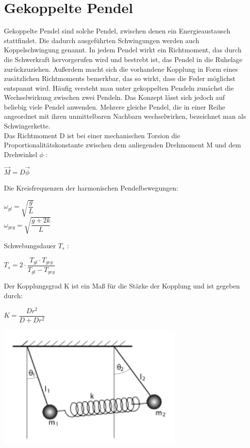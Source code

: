 \chapter{Gekoppelte Pendel}
Gekoppelte Pendel sind solche Pendel, zwischen denen ein Energieaustausch stattfindet. Die dadurch ausgeführten Schwingungen werden auch Koppelschwingung genannt. In jedem Pendel wirkt ein Richtmoment, das durch die Schwerkraft hervorgerufen wird und bestrebt ist, das Pendel in die Ruhelage zurückzuziehen. Außerdem macht sich die vorhandene Kopplung in Form eines zusätzlichen Richtmoments bemerkbar, das so wirkt, dass die Feder möglichst entspannt wird.
Häufig versteht man unter gekoppelten Pendeln zunächst die Wechselwirkung zwischen zwei Pendeln. Das Konzept lässt sich jedoch auf beliebig viele Pendel anwenden. Mehrere gleiche Pendel, die in einer Reihe angeordnet mit ihren unmittelbaren Nachbarn wechselwirken, bezeichnet man als Schwingerkette.
\\
Das Richtmoment D ist bei einer mechanischen Torsion die Proportionalitätskonstante zwischen dem anliegenden Drehmoment
M und dem Drehwinkel $\phi$ :
\begin{center}
$\vec{M}= D\vec{\phi}$\\
\end{center}
Die Kreisfrequenzen der harmonischen Pendelbewegungen:
\begin{center}
 $\omega_{gl} = \sqrt{\dfrac{g}{L}}$ \\
 $\omega_{geg} =\sqrt{\dfrac{g+2k}{L}}$
\end{center}
Schwebungsdauer $T_{s}$ :
\begin{center}
 $T_{s}= 2\cdot\dfrac{T_{gl}\cdot T_{geg}}
{T_{gl}-T_{geg}}$
\end{center}
Der Kopplungsgrad K ist ein Maß für die Stärke der Kopplung und ist gegeben durch:
\begin{center}
 $K= \dfrac{Dr^2}
 {D+Dr^2}$
\end{center}
\begin{minipage}{\textwidth}
 \centering
 \includegraphics[width=0.7\textwidth]{gekpendel}
 \label{fig:Abb4}
\end{minipage}
